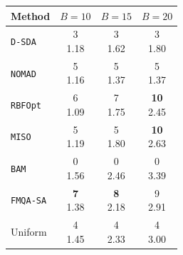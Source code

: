 \begin{tabular}{@{}lccc@{}}\toprule
Method & \(B=10\) & \(B=15\) & \(B=20\)\\\midrule
\texttt{D-SDA} & \makecell{3\\1.18} & \makecell{3\\1.62} & \makecell{3\\1.80} \\
\texttt{NOMAD} & \makecell{5\\1.16} & \makecell{5\\1.37} & \makecell{5\\1.37} \\
\texttt{RBFOpt} & \makecell{6\\1.09} & \makecell{7\\1.75} & \makecell{\textbf{10}\\2.45} \\
\texttt{MISO} & \makecell{5\\1.19} & \makecell{5\\1.80} & \makecell{\textbf{10}\\2.63} \\
\texttt{BAM} & \makecell{0\\1.56} & \makecell{0\\2.46} & \makecell{0\\3.39} \\
\texttt{FMQA-SA} & \makecell{\textbf{7}\\1.38} & \makecell{\textbf{8}\\2.18} & \makecell{9\\2.91} \\
Uniform & \makecell{4\\1.45} & \makecell{4\\2.33} & \makecell{4\\3.00} \\
\bottomrule\end{tabular}
